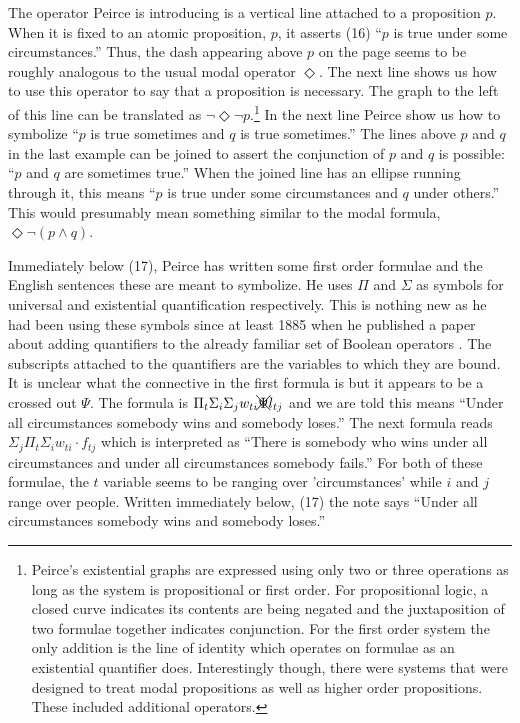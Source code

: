  The operator Peirce is introducing is a vertical line attached to a proposition $p$. When it is fixed to an atomic proposition, $p$, it asserts (16) ``$p$ is true under some circumstances.'' Thus, the dash appearing above $p$ on the page seems to be roughly analogous to the usual modal operator $\Diamond$. The next line shows us how to use this operator to say that a proposition is necessary. The graph to the left of this line can be translated as $\lnot \Diamond \lnot p$.\footnote{ Peirce's existential graphs are expressed using only two or three operations as long as the system is propositional or first order. For propositional logic, a closed curve indicates its contents are being negated and the juxtaposition of two formulae together indicates conjunction. For the first order system the only addition is the line of identity which operates on formulae as an existential quantifier does. Interestingly though, there were systems that were designed to treat modal propositions as well as higher order propositions. These included additional operators.} In the next line Peirce show us how to symbolize ``$p$ is true sometimes and $q$ is true sometimes.'' The lines above $p$ and $q$ in the last example can be joined to assert the conjunction of $p$ and $q$ is possible: ``$p$ and $q$ are sometimes true.'' When the joined line has an ellipse running through it, this means ``$p$ is true under some circumstances and $q$ under others.'' This would presumably mean something similar to the modal formula, $\Diamond \lnot (p \land q)$.
 
 Immediately below (17), Peirce has written some first order formulae and the English sentences these are meant to symbolize. He uses $\Pi$ and $\Sigma$ as symbols for universal and existential quantification respectively. This is nothing new as he had been using these symbols since at least 1885 when he published a paper about adding quantifiers to the already familiar set of Boolean operators \citep{peirce_algebra_1880}. The subscripts attached to the quantifiers are the variables to which they are bound. It is unclear what the connective in the first formula is but it appears to be a crossed out $\Psi$. The formula is $\Pi_{t} \Sigma_{i} \Sigma_{j} w_{ti} \xcancel{\Psi} l_{tj}$ and we are told this means ``Under all circumstances somebody wins and somebody loses.'' The next formula reads $\Sigma_{j} \Pi_{t} \Sigma_{i} w_{ti} \cdot f_{tj}$ which is interpreted as ``There is somebody who wins under all circumstances and under all circumstances somebody fails.'' For both of these formulae, the $t$ variable seems to be ranging over 'circumstances' while $i$ and $j$ range over people. Written immediately below, (17) the note says ``Under all circumstances somebody wins and somebody loses.''

